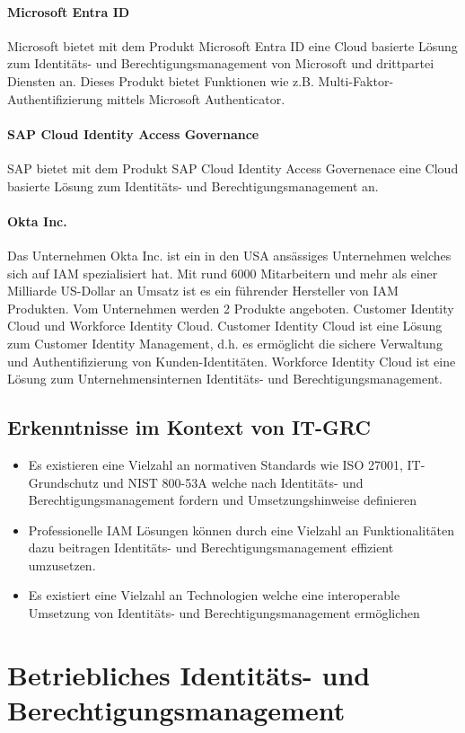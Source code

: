 \documentclass[11pt]{article}
\begin{document}
\paragraph{Microsoft Entra ID}
Microsoft bietet mit dem Produkt \glqq{}Microsoft Entra ID\grqq{} eine Cloud basierte Lösung zum Identitäts- und Berechtigungsmanagement von Microsoft und drittpartei Diensten an. Dieses Produkt bietet Funktionen wie z.B. Multi-Faktor-Authentifizierung mittels Microsoft Authenticator.
\paragraph{SAP Cloud Identity Access Governance}
SAP bietet mit dem Produkt \glqq{}SAP Cloud Identity Access Governenace\grqq{} eine Cloud basierte Lösung zum Identitäts- und Berechtigungsmanagement an.
\paragraph{Okta Inc.}
Das Unternehmen Okta Inc. ist ein in den USA ansässiges Unternehmen welches sich auf IAM spezialisiert hat. Mit rund 6000 Mitarbeitern und mehr als einer Milliarde US-Dollar an Umsatz ist es ein führender Hersteller von IAM Produkten. Vom Unternehmen werden 2 Produkte angeboten. Customer Identity Cloud und Workforce Identity Cloud. Customer Identity Cloud ist eine Lösung zum Customer Identity Management, d.h. es ermöglicht die sichere Verwaltung und Authentifizierung von Kunden-Identitäten. Workforce Identity Cloud ist eine Lösung zum Unternehmensinternen Identitäts- und Berechtigungsmanagement.
\subsection{Erkenntnisse im Kontext von IT-GRC}
\begin{itemize}
  \item Es existieren eine Vielzahl an normativen Standards wie ISO 27001, IT-Grundschutz und NIST 800-53A welche nach Identitäts- und Berechtigungsmanagement fordern und Umsetzungshinweise definieren
  \item Professionelle IAM Lösungen können durch eine Vielzahl an Funktionalitäten dazu beitragen Identitäts- und Berechtigungsmanagement effizient umzusetzen.
  \item Es existiert eine Vielzahl an Technologien welche eine interoperable Umsetzung von Identitäts- und Berechtigungsmanagement ermöglichen
\end{itemize}
\section{Betriebliches Identitäts- und Berechtigungsmanagement}
\label{sec:betrieb}
\end{document}
